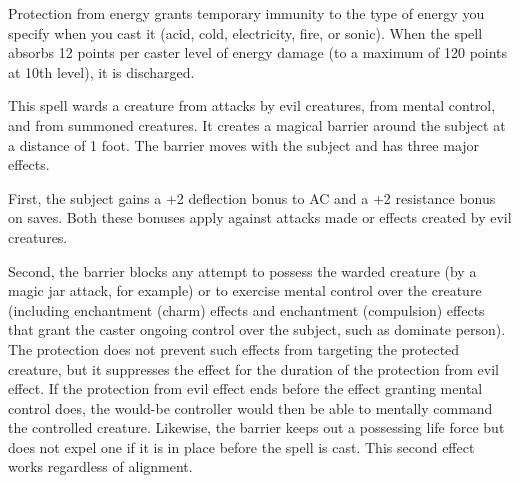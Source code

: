 \begin{multicols}{2}
\begin{small}
\noindent Protection from energy grants temporary immunity to the type of energy you specify when you cast it (acid, cold, electricity, fire, or sonic). When the spell absorbs 12 points per caster level of energy damage (to a maximum of 120 points at 10th level), it is discharged.


\noindent This spell wards a creature from attacks by evil creatures, from mental control, and from summoned creatures. It creates a magical barrier around the subject at a distance of 1 foot. The barrier moves with the subject and has three major effects.

\smallskip\noindent First, the subject gains a +2 deflection bonus to AC and a +2 resistance bonus on saves. Both these bonuses apply against attacks made or effects created by evil creatures.

\smallskip\noindent Second, the barrier blocks any attempt to possess the warded creature (by a magic jar attack, for example) or to exercise mental control over the creature (including enchantment (charm) effects and enchantment (compulsion) effects that grant the caster ongoing control over the subject, such as dominate person). The protection does not prevent such effects from targeting the protected creature, but it suppresses the effect for the duration of the protection from evil effect. If the protection from evil effect ends before the effect granting mental control does, the would-be controller would then be able to mentally command the controlled creature. Likewise, the barrier keeps out a possessing life force but does not expel one if it is in place before the spell is cast. This second effect works regardless of alignment.


\end{small}
\end{multicols}
